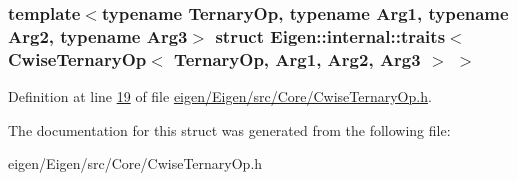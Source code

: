 \subsubsection*{template$<$typename Ternary\+Op, typename Arg1, typename Arg2, typename Arg3$>$\newline
struct Eigen\+::internal\+::traits$<$ Cwise\+Ternary\+Op$<$ Ternary\+Op, Arg1, Arg2, Arg3 $>$ $>$}



Definition at line \hyperlink{eigen_2_eigen_2src_2_core_2_cwise_ternary_op_8h_source_l00019}{19} of file \hyperlink{eigen_2_eigen_2src_2_core_2_cwise_ternary_op_8h_source}{eigen/\+Eigen/src/\+Core/\+Cwise\+Ternary\+Op.\+h}.



The documentation for this struct was generated from the following file\+:\begin{DoxyCompactItemize}
\item 
eigen/\+Eigen/src/\+Core/\+Cwise\+Ternary\+Op.\+h\end{DoxyCompactItemize}
